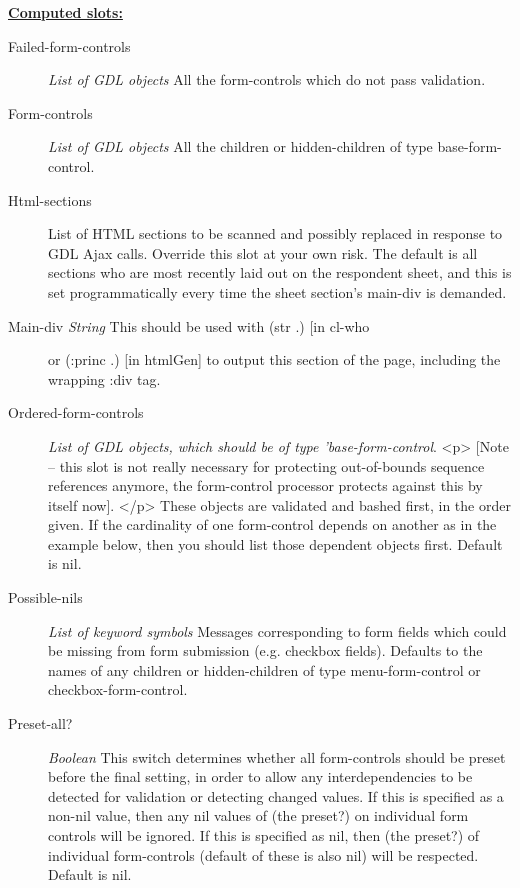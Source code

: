 \documentclass [11pt]{book}
\begin{document}
\begin{itemize}
\begin{description}
\end{description}






\textbf{
\underline{Computed slots:}}

\begin{description}

\item [Failed-form-controls]
\emph{List of GDL objects} All the form-controls which do not pass validation.


\item [Form-controls]
\emph{List of GDL objects} All the children or hidden-children
of type base-form-control.


\item [Html-sections]
List of HTML sections to be scanned and possibly replaced in response to
GDL Ajax calls. Override this slot at your own risk. The default is all
sections who are most recently laid out on the respondent sheet, and
this is set programmatically every time the sheet section's main-div
is demanded.


\item [Main-div%
\emph{String} This should be used with (str .) [in cl-who] or (:princ .)
[in htmlGen] to output this section of the page, including the wrapping :div tag.


\item [Ordered-form-controls]
\emph{List of GDL objects, which should be of type 'base-form-control}.
<p>
[Note -- this slot is not really necessary for protecting out-of-bounds sequence references
anymore, the form-control processor protects against this by itself now].
</p>
These objects are validated and bashed first, in the order given. If the cardinality
of one form-control depends on another as in the example below, then you should list
those dependent objects first. Default is nil.


\item [Possible-nils]
\emph{List of keyword symbols} Messages corresponding to form fields which could
be missing from form submission (e.g. checkbox fields). Defaults to the names
of any children or hidden-children of type  menu-form-control or
checkbox-form-control.


\item [Preset-all?]
\emph{Boolean} This switch determines whether all form-controls should be preset
before the final setting, in order to allow any interdependencies to be detected
for validation or detecting changed values. If this is specified as a non-nil
value, then any nil values of (the preset?) on individual form controls will be
ignored. If this is specified as nil, then (the preset?) of individual
form-controls (default of these is also nil) will be respected. Default is nil.



\end{description}
\end{itemize}
\end{document}
